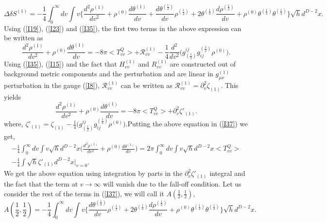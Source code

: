 \documentclass[12pt]{article}
\begin{document}
 \begin{equation}\label{I37}
 \Delta \delta S^{(1)}=-\frac{1}{4}\int_{0}^{\infty}dv \int v \Big\{\frac{d^2\rho^{(1)} }{dv^2}+ \rho^{(0)}\frac{d\theta^{(1)}}{dv} +\frac{d\theta^{(\frac{1}{2})}}{dv} \rho^{(\frac{1}{2})} + 2 \theta^{(\frac{1}{2})} \frac{d\rho^{(\frac{1}{2})}}{dv} + \rho^{(0)} \theta^{(\frac{1}{2})} \theta^{(\frac{1}{2})} \Big\} \sqrt{h} d^{D-2}x.
\end{equation}
Using (\ref{I19}), (\ref{I23}) and (\ref{I35}), the first two terms in the above expression can be written as
\begin{equation}\label{I38}
\frac{d^2\rho^{(1)} }{dv^2}+ \rho^{(0)} \frac{d\theta^{(1)}}{dv} =-8\pi<T^{Q}_{vv}> + \mathcal{R}^{(1)}_{vv}-\frac{1}{4}\frac{d^2}{dv^2}\Big(g^{ij}_{(\frac{1}{2})}g_{ij}^{(\frac{1}{2})}\rho^{(0)}\Big).
\end{equation}
Using (\ref{I35}), (\ref{I15}) and the fact that $H^{(1)}_{vv}$ and $R^{(1)}_{vv}$ are constructed out of background metric components and the perturbation and are linear in $g^{(1)}_{\mu \nu}$ perturbation in the gauge (\ref{I8}), $\mathcal{R}^{(1)}_{vv}$ can be written as $\mathcal{R}^{(1)}_{vv}= \partial_{v}^2 \zeta_{(1)}$.  This yields
\begin{equation}\label{I38a}
\frac{d^2\rho^{(1)} }{dv^2}+ \rho^{(0)} \frac{d\theta^{(1)}}{dv} =-8\pi<T^{Q}_{vv}> + \partial_v^2 \zeta'_{(1)}.
\end{equation}
where, $\zeta'_{(1)}=\zeta_{(1)}-\frac{1}{4}\Big(g^{ij}_{(\frac{1}{2})}g_{ij}^{(\frac{1}{2})}\rho^{(0)}\Big)$.Putting the above equation in (\ref{I37}) we get,
\begin{multline}\label{I39}
-\frac{1}{4}\int_{0}^{\infty}dv \int v \sqrt{h} d^{D-2}x \Big(\frac{d^2\rho^{(1)} }{dv^2}+ \rho^{(0)} \frac{d\theta^{(1)}}{dv}\Big) =2\pi\int_{0}^{\infty}dv \int v \sqrt{h} d^{D-2}x   <T^{Q}_{vv}>  \\  - \frac{1}{4} \int \sqrt{h} \zeta'_{(1)} d^{D-2}x \Big|_{v=0}.
\end{multline}
We get the above equation using integration by parts in the $\partial_v^2 \zeta'_{(1)}$ integral and the fact that the term at $v\rightarrow \infty$ will vanish due to the fall-off condition. Let us consider the rest of the terms in (\ref{I37}), we will call it
$A(\frac{1}{2},\frac{1}{2})$,
\begin{equation}\label{I40}
A(\frac{1}{2},\frac{1}{2}) = -\frac{1}{4}\int_{0}^{\infty}dv \int v \Big\{\frac{d\theta^{(\frac{1}{2})}}{dv} \rho^{(\frac{1}{2})} + 2 \theta^{(\frac{1}{2})} \frac{d\rho^{(\frac{1}{2})}}{dv} + \rho^{(0)} \theta^{(\frac{1}{2})} \theta^{(\frac{1}{2})} \Big\} \sqrt{h} d^{D-2}x.
\end{equation}
\end{document}

